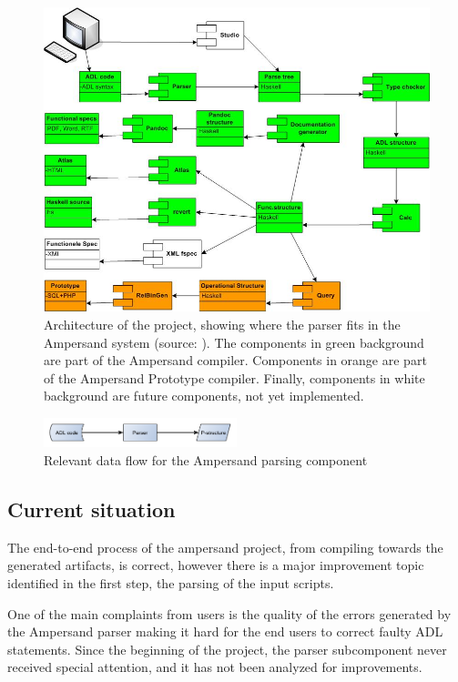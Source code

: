 %
\begin{figure}[htb!]
	\centering
	\includegraphics[width=\textwidth]{Figures/ADL_systeemarchitectuur}
	\caption[Architecture of the project]{Architecture of the project, showing where the parser fits in the Ampersand system (source: \cite{ampersand-architecture}).\small
	The components in green background are part of the Ampersand compiler.
	Components in orange are part of the Ampersand Prototype compiler.
	Finally, components in white background are future components, not yet implemented.}
	\label{fig:architecture}
\end{figure}
%
\begin{figure}[htb!]
	\centering
	\includegraphics[width=0.5\textwidth]{Figures/Architecture}
	\caption{Relevant data flow for the Ampersand parsing component}
	\label{fig:data-flow}
\end{figure}

\subsection{Current situation}
The end-to-end process of the ampersand project, from compiling towards the generated artifacts, is correct, however there is a major improvement topic identified in the first step, the parsing of the input scripts.

One of the main complaints from users is the quality of the errors generated by the Ampersand parser making it hard for the end users to correct faulty ADL statements.
Since the beginning of the project, the parser subcomponent never received special attention, and it has not been analyzed for improvements.

